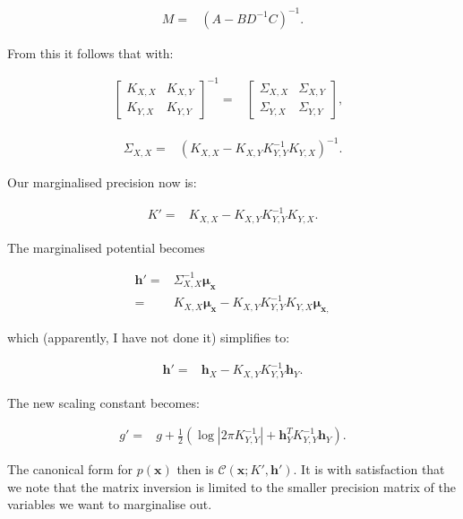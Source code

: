 \begin{align*}
M= & \left(A-BD^{-1}C\right)^{-1}.
\end{align*}


From this it follows that with:

\begin{align*}
\left[\begin{array}{cc}
K_{X,X} & K_{X,Y}\\
K_{Y,X} & K_{Y,Y}
\end{array}\right]^{-1}= & \left[\begin{array}{cc}
\Sigma_{X,X} & \Sigma_{X,Y}\\
\Sigma_{Y,X} & \Sigma_{Y,Y}
\end{array}\right],\text{ }
\end{align*}


\begin{align*}
\Sigma_{X,X}= & (K_{X,X}-K_{X,Y}K_{Y,Y}^{-1}K_{Y,X})^{-1}.
\end{align*}


Our marginalised precision now is:

\begin{align}
K'= & K_{X,X}-K_{X,Y}K_{Y,Y}^{-1}K_{Y,X}.\label{eq:cfmarg_K}
\end{align}


The marginalised potential becomes

\begin{align*}
\mathbf{h'=} & \Sigma_{X,X}^{-1}\mathbf{\mu_{x}}\\
= & K_{X,X}\mathbf{\mu_{x}}-K_{X,Y}K_{Y,Y}^{-1}K_{Y,X}\mathbf{\mu_{x,}}
\end{align*}


which (apparently, I have not done it) simplifies to:

\begin{align}
\mathbf{h}'= & \mathbf{h}_{X}-K_{X,Y}K_{Y,Y}^{-1}\mathbf{h}_{Y}.\label{eq:cfmarg_h}
\end{align}

The new scaling constant becomes:

\begin{align}
g' =& g + \frac{1}{2}\left(\log|2\pi K_{Y,Y}^{-1}| + \mathbf{h}_Y^T K_{Y,Y}^{-1}\mathbf{h}_Y\right). \label{eq:cfmarg_g}
\end{align}

The canonical form for $p(\mathbf{x})$ then is $\mathcal{C}(\mathbf{x};K',\mathbf{h}')$.
It is with satisfaction that we note that the matrix inversion is
limited to the smaller precision matrix of the variables we want to
marginalise out.


